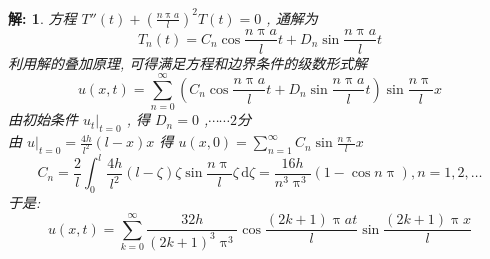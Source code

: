 \documentclass{article}
\theoremstyle{nonumberplain}
\newtheorem{solution}{\textcolor{gr}{解:}}
\newcommand{\dd}{\,\mathrm{d}}
\begin{document}
\begin{solution}
        方程 $T''(t)+\left( \frac{n\uppi a}{l} \right)^2 T(t)=0$ , 通解为
        \begin{equation*}
        	T_{n}(t)=C_{n}\cos\frac{n\uppi a}{l}t+D_{n}\sin\frac{n\uppi a}{l}t\tag*{$\cdots\cdots2$分}
        \end{equation*}
        利用解的叠加原理, 可得满足方程和边界条件的级数形式解
        \begin{equation*}
        	u(x,t)=\sum_{n=0}^{\infty}\left( C_{n}\cos\frac{n\uppi a}{l}t+D_{n}\sin\frac{n\uppi a}{l}t \right)\sin\frac{n\uppi}{l}x \tag*{$\cdots\cdots1$分}
        \end{equation*}
        由初始条件 $u_{t}|_{t=0}$ , 得 $D_{n}=0$ ,\hfill$\cdots\cdots2$分\\
        由 $u|_{t=0}=\frac{4h}{l^2}(l-x)x$ 得 $u(x,0)=\sum_{n=1}^{\infty}C_{n}\sin\frac{n\uppi}{l}x$
        \begin{equation*}
        	C_{n}=\frac{2}{l}\int_{0}^{l}\frac{4h}{l^2}(l-\zeta)\zeta\sin\frac{n\uppi}{l}\zeta\dd\zeta=\frac{16h}{n^3\uppi^3}(1-\cos n\uppi),n=1,2,\ldots\tag*{$\cdots\cdots2$分}
        \end{equation*}
        于是:
        \begin{equation*}
        	u(x,t)=\sum_{k=0}^{\infty}\frac{32h}{(2k+1)^3\uppi^3}\cos\frac{(2k+1)\uppi at}{l}\sin\frac{(2k+1)\uppi x}{l}\tag*{$\cdots\cdots3$分}
        \end{equation*}
    \end{solution}
    
\end{document}
